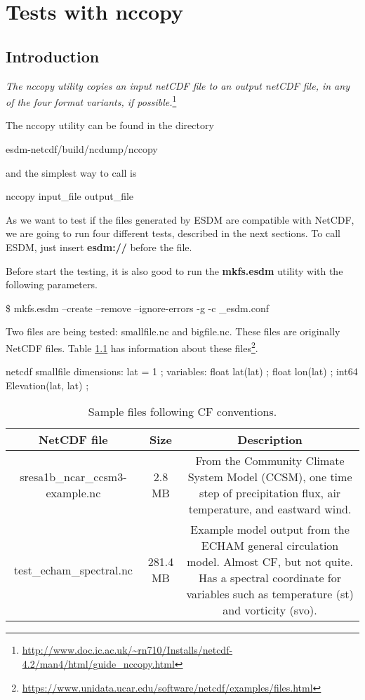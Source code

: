 \chapter{Tests with nccopy}

\section{Introduction}

\tab
\textit{The nccopy utility copies an input netCDF file to an output netCDF file, in any of the four format variants, if possible.}\footnote{\url{http://www.doc.ic.ac.uk/~rn710/Installs/netcdf-4.2/man4/html/guide_nccopy.html}}

The nccopy utility can be found in the directory

\begin{framed}
esdm-netcdf/build/ncdump/nccopy
\end{framed}

and the simplest way to call is

\begin{framed}
nccopy input\_file output\_file
\end{framed}

As we want to test if the files generated by ESDM are compatible with NetCDF, we are going to run four different tests, described in the next sections. To call ESDM, just insert \textbf{esdm://} before the file.

Before start the testing, it is also good to run the \textbf{mkfs.esdm} utility with the following parameters.

\begin{framed}
\$ mkfs.esdm --create --remove --ignore-errors -g -c \_esdm.conf
\end{framed}

Two files are being tested: smallfile.nc and bigfile.nc. These files are originally NetCDF files. Table \ref{tab:netcdf} has information about these files\footnote{\url{https://www.unidata.ucar.edu/software/netcdf/examples/files.html}}.

netcdf smallfile {
dimensions:
	lat = 1 ;
variables:
	float lat(lat) ;
	float lon(lat) ;
	int64 Elevation(lat, lat) ;
}

\begin{table}[H]
\centering
\begin{tabular}{|c|c|c|}
\hline
NetCDF file	& Size & Description \\ \hline \hline
sresa1b\_ncar\_ccsm3-example.nc & 2.8 MB & From the Community Climate System Model (CCSM), one time step of precipitation flux, air temperature, and eastward wind. \\ \hline
test\_echam\_spectral.nc & 281.4 MB & Example model output from the ECHAM general circulation model. Almost CF, but not quite. Has a spectral coordinate for variables such as temperature (st) and vorticity (svo). \\ \hline
\hline
\end{tabular}
\caption{\label{tab:netcdf} Sample files following CF conventions.}
\end{table}

